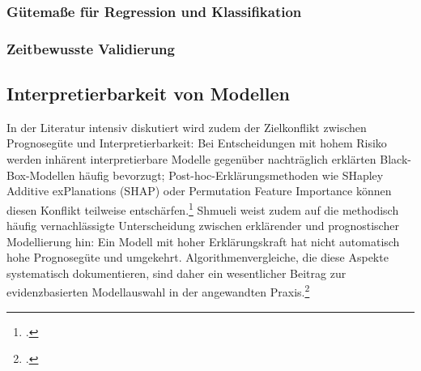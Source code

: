 \documentclass[12pt,a4paper]{article}
\begin{document}

\subsubsection{Gütemaße für Regression und Klassifikation}

\subsubsection{Zeitbewusste Validierung}



\subsection{Interpretierbarkeit von Modellen}


In der Literatur intensiv diskutiert wird zudem der Zielkonflikt zwischen Prognosegüte und
Interpretierbarkeit: Bei Entscheidungen mit hohem Risiko werden inhärent interpretierbare Modelle
gegenüber nachträglich erklärten Black-Box-Modellen häufig bevorzugt; Post-hoc-Erklärungsmethoden
wie SHapley Additive exPlanations (SHAP) oder Permutation Feature Importance können diesen Konflikt
teilweise entschärfen.\footcite{Rudin2019} Shmueli weist zudem auf die methodisch häufig
vernachlässigte Unterscheidung zwischen erklärender und prognostischer Modellierung hin: Ein Modell
mit hoher Erklärungskraft hat nicht automatisch hohe Prognosegüte und umgekehrt. Algorithmenvergleiche,
die diese Aspekte systematisch dokumentieren, sind daher ein wesentlicher Beitrag zur
evidenzbasierten Modellauswahl in der angewandten Praxis.\footcite{Shmueli2010}
\end{document}
